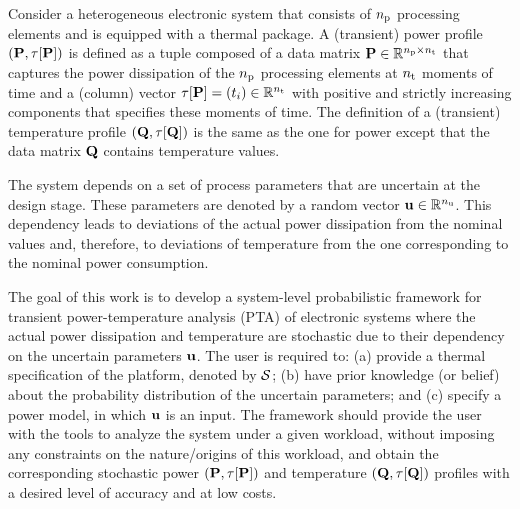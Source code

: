 
Consider a heterogeneous electronic system that consists of ${n_\text{p}}$ processing
elements and is equipped with a thermal package. A (transient) power profile
$\profileP$ is defined as a tuple composed of a data matrix $\mP \in
\real^{\nprocs \times \nsteps}$ that captures the power dissipation of the
${n_\text{p}}$ processing elements at ${n_\text{t}}$ moments of time and a (column) vector
$\partition{\mP} = (\t_i) \in \real^{\nsteps}$ with positive and strictly
increasing components that specifies these moments of time. The definition of a
(transient) temperature profile $\profileT$ is the same as the one for power
except that the data matrix $\mTO$ contains temperature values.

The system depends on a set of process parameters that are uncertain at the
design stage. These parameters are denoted by a random vector $\mathbf{u} \in
\mathbb{R}^{n_\text{u}}$. This dependency leads to deviations of the actual power
dissipation from the nominal values and, therefore, to deviations of temperature
from the one corresponding to the nominal power consumption.

The goal of this work is to develop a system-level probabilistic framework for
transient power-temperature analysis (PTA) of electronic systems where the
actual power dissipation and temperature are stochastic due to their dependency
on the uncertain parameters $\mathbf{u}$. The user is required to: (a) provide a
thermal specification of the platform, denoted by $\mathcal{S}$; (b) have prior
knowledge (or belief) about the probability distribution of the uncertain
parameters; and (c) specify a power model, in which $\mathbf{u}$ is an input. The
framework should provide the user with the tools to analyze the system under a
given workload, without imposing any constraints on the nature/origins of this
workload, and obtain the corresponding stochastic power $\profileP$ and
temperature $\profileT$ profiles with a desired level of accuracy and at low
costs.
